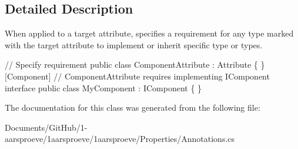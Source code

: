\subsection{Detailed Description}
When applied to a target attribute, specifies a requirement for any type marked with the target attribute to implement or inherit specific type or types. 


\begin{DoxyCode}
 \textcolor{comment}{// Specify requirement}
\textcolor{keyword}{public} \textcolor{keyword}{class} ComponentAttribute : Attribute \{ \}
[Component] \textcolor{comment}{// ComponentAttribute requires implementing IComponent interface}
\textcolor{keyword}{public} \textcolor{keyword}{class }MyComponent : IComponent \{ \}
\end{DoxyCode}


The documentation for this class was generated from the following file\+:\begin{DoxyCompactItemize}
\item 
Documents/\+Git\+Hub/1-\/aarsproeve/1aarsproeve/1aarsproeve/\+Properties/Annotations.\+cs\end{DoxyCompactItemize}
